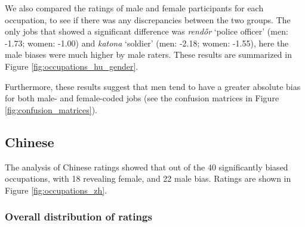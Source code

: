 \documentclass[11pt]{article}
\begin{document}
We also compared the ratings of male and female participants for each occupation, to see if there was any discrepancies between the two groups. The only jobs that showed a significant difference was \textit{rendőr} `police officer' (men: -1.73; women: -1.00) and \textit{katona} `soldier' (men: -2.18; women: -1.55), here the male biases were much higher by male raters. These results are summarized in Figure \ref{fig:occupations_hu_gender}.

Furthermore, these results suggest that men tend to have a greater absolute bias for both male- and female-coded jobs (see the confusion matrices in Figure \ref{fig:confusion_matrices}).



\subsection{Chinese}



The analysis of Chinese ratings showed that out of the 40 significantly biased occupations, with 18 revealing female, and 22 male bias. Ratings are shown in Figure \ref{fig:occupations_zh}.

\subsubsection{Overall distribution of ratings}

\end{document}
